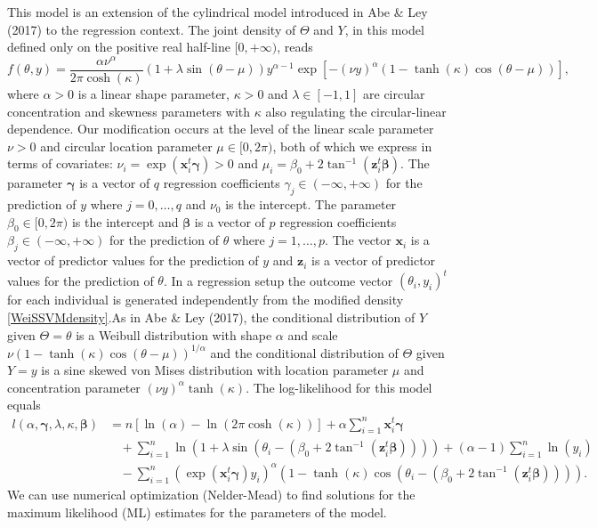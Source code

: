 \documentclass[12pt,]{article}
\begin{document}
This model is an extension of the cylindrical model introduced in Abe \&
Ley (2017) to the regression context. The joint density of \(\Theta\)
and \(Y\), in this model defined only on the positive real half-line
\([0, + \infty)\), reads \begin{equation}\label{WeiSSVMdensity}
f(\theta, y) = \frac{\alpha\nu^\alpha}{2\pi\cosh(\kappa)}
                 (1 +\lambda\sin(\theta - \mu))
                 y^{\alpha-1}
                 \exp[-(\nu y)^{\alpha}(1-\tanh(\kappa)\cos(\theta - \mu))],
\end{equation} \noindent where \(\alpha > 0\) is a linear shape
parameter, \(\kappa > 0\) and \(\lambda \in [-1, 1]\) are circular
concentration and skewness parameters with \(\kappa\) also regulating
the circular-linear dependence. Our modification occurs at the level of
the linear scale parameter \(\nu>0\) and circular location parameter
\(\mu\in [0, 2\pi)\), both of which we express in terms of covariates:
\(\nu_i = \exp(\boldsymbol{x}_i^t\boldsymbol{\gamma}) > 0\) and
\(\mu_i = \beta_0 + 2\tan^{-1}(\boldsymbol{z}_i^t\boldsymbol{\beta})\).
The parameter \(\boldsymbol{\gamma}\) is a vector of \(q\) regression
coefficients \(\gamma_j \in (-\infty, +\infty)\) for the prediction of
\(y\) where \(j = 0, \dots, q\) and \(\nu_0\) is the intercept. The
parameter \(\beta_0 \in [0, 2\pi)\) is the intercept and
\(\boldsymbol{\beta}\) is a vector of \(p\) regression coefficients
\(\beta_j \in (-\infty, +\infty)\) for the prediction of \(\theta\)
where \(j = 1, \dots, p\). The vector \(\boldsymbol{x}_i\) is a vector
of predictor values for the prediction of \(y\) and \(\boldsymbol{z}_i\)
is a vector of predictor values for the prediction of \(\theta\). In a
regression setup the outcome vector \((\theta_i, y_i)^t\) for each
individual is generated independently from the modified density
\eqref{WeiSSVMdensity}.\newline \indent As in Abe \& Ley (2017), the
conditional distribution of \(Y\) given \(\Theta=\theta\) is a Weibull
distribution with shape \(\alpha\) and scale
\(\nu(1-\tanh(\kappa)\cos(\theta - \mu))^{1/\alpha}\) and the
conditional distribution of \(\Theta\) given \(Y=y\) is a sine skewed
von Mises distribution with location parameter \(\mu\) and concentration
parameter \((\nu y)^\alpha\tanh(\kappa)\). The log-likelihood for this
model equals \begin{align}\label{WeiSSVMLikelihood}
l(\alpha, \boldsymbol{\gamma}, \lambda, \kappa, \boldsymbol{\beta}) 
   &= n[\ln(\alpha) - \ln(2\pi\cosh(\kappa))] + \alpha \sum^{n}_{i = 1} \boldsymbol{x}_i^t\boldsymbol{\gamma} \nonumber\\
   &\:\:\:\:+\sum^{n}_{i = 1} \ln(1 +\lambda\sin(\theta_i - (\beta_0 + 2\tan^{-1}(\boldsymbol{z}_i^t\boldsymbol{\beta})))) 
   +(\alpha-1)\sum^{n}_{i = 1} \ln(y_i) \nonumber\\
   &\:\:\:\:-\sum^{n}_{i = 1}( \exp(\boldsymbol{x}_i^t\boldsymbol{\gamma})y_i)^{\alpha}(1-\tanh(\kappa)\cos(\theta_i - (\beta_0 + 2\tan^{-1}(\boldsymbol{z}_i^t\boldsymbol{\beta})))).\nonumber
\end{align} \noindent We can use numerical optimization (Nelder-Mead) to
find solutions for the maximum likelihood (ML) estimates for the
parameters of the model.
\end{document}
